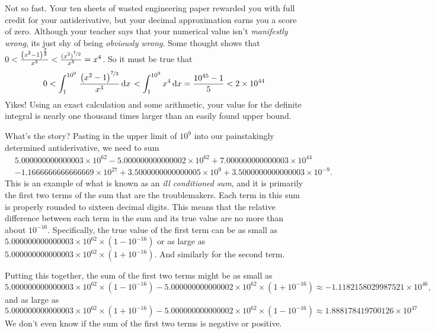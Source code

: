\documentclass[12pt,fleqn]{article}
\newcounter{ex}\setcounter{ex}{0}
\begin{document}
Not so fast. Your ten sheets of wasted engineering paper rewarded
you with full credit for your antiderivative, but your
decimal approximation earns you a score of zero. Although your teacher says that 
your numerical value isn't \emph{manifestly wrong}, its 
just shy of being \emph{obviously wrong}. Some thought 
shows that $0 < \frac{{{\left( {{x}^{2}}-1\right) }^{\frac{7}{2}}}}{{{x}^{3}}}
< \frac{(x^2)^{\nicefrac{7}{2}}} {x^3} = x^4$. So it must be true that
\begin{equation*}
   0 <  \int_1^{10^9} {\left. \frac{{{\left( {{x}^{2}}-1\right) }^{\nicefrac{7}{2}}}}{{{x}^{3}}} \, \mathrm{d}x\right.}
       < \int_1^{10^9} x^4 \, \mathrm{d}x =  \frac{10^{45} - 1 }{5} < 2  \times 10^{44}
\end{equation*}
Yikes! Using an exact calculation and some arithmetic, your value 
for the definite integral is nearly one thousand times larger than
an easily found upper bound.

What's the story?  Pasting in the upper limit of $10^9$ into our 
painstakingly determined antiderivative, we need to sum
\begin{align*}
&5.000000000000003 \times  {{10}^{62}} - 5.000000000000002  \times 
{{10}^{62}} + 7.000000000000003 \times {{10}^{44}}  \\
&-1.1666666666666669 \times {{10}^{27}} + 
3.5000000000000005 \times {{10}^{9}} + 3.5000000000000003 \times {{10}^{-9}}.
\end{align*}
This is an example of what is known as an \emph{ill conditioned sum}, and 
it is primarily  the first two terms of the sum that are the 
troublemakers. Each term in this sum is properly rounded to sixteen 
decimal digits. This means that the relative difference between 
each term in the sum and its true value are no more than about 
$10^{-16}$. Specifically, the true value of the first term 
can be as small as $5.000000000000003 \times  {{10}^{62}} \times
(1 - 10^{-16})$ or as large as $5.000000000000003 \times  {{10}^{62}} 
\times (1 + 10^{-16})$. And similarly for the second term.

Putting this together, the sum of the first two terms might be as small
as 
\begin{equation*}
  5.000000000000003 \times 10^{62} \times (1 -  10^{-16}) - 5
   .000000000000002 \times 10^{62} \times  (1  + 10^{-16})
   \approx -1.1182158029987521 \times 10^{46},
\end{equation*}
and as large as 
\begin{equation*}
  5.000000000000003 \times 10^{62} \times (1 + 10^{-16}) - 5
   .000000000000002 \times 10^{62} \times  (1  - 10^{-16})
   \approx 1.888178419700126 \times {{10}^{47}}
\end{equation*}
We don't even know if the sum of the first two terms is negative 
or positive. 
\end{document}
